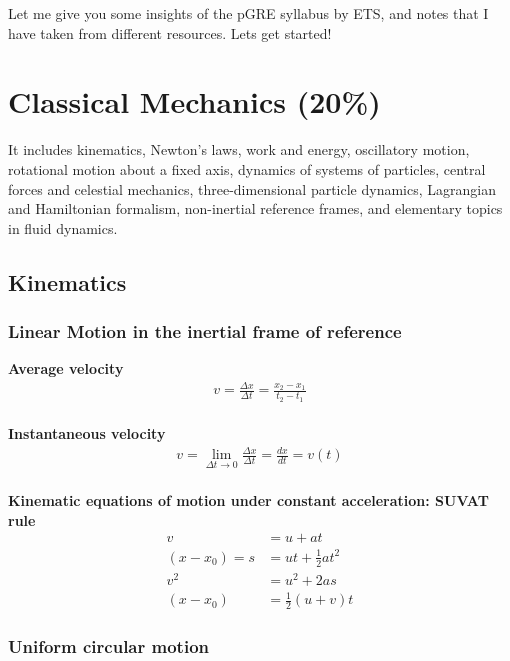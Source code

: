 \documentclass[12pt,a4paper]{article}
\begin{document}
Let me give you some insights of the pGRE syllabus by ETS, and notes that I have taken from different resources. Lets get started!

\section{Classical Mechanics (20\%)}

\quad It includes kinematics, Newton's laws, work and energy, oscillatory motion, rotational motion about a fixed axis, dynamics of systems of particles, central forces and celestial mechanics, three-dimensional particle dynamics, Lagrangian and Hamiltonian formalism, non-inertial reference frames, and elementary topics in fluid dynamics.

\subsection{Kinematics}

\subsubsection{Linear Motion in the inertial frame of reference}

\textbf{Average velocity}
\begin{align}
v = \frac{\Delta x}{\Delta t} = \frac{x_{2} - x_{1}}{t_{2} - t_{1}}
\end{align}
\\
\textbf{Instantaneous velocity}
\begin{align}
v = \lim_{\Delta t \to 0} \frac{\Delta x}{\Delta t} = \frac{dx}{dt} = v(t)
\end{align}
\\
\textbf{Kinematic equations of motion under constant acceleration: SUVAT rule}
\begin{align}
v &= u + at\\
(x - x_{0}) = s &= ut + \frac{1}{2}at^{2} \\
v^{2} &= u^{2} + 2as \\
(x - x_{0}) &= \frac{1}{2}(u + v)t 
\end{align}

\subsubsection{Uniform circular motion}
\end{document}
